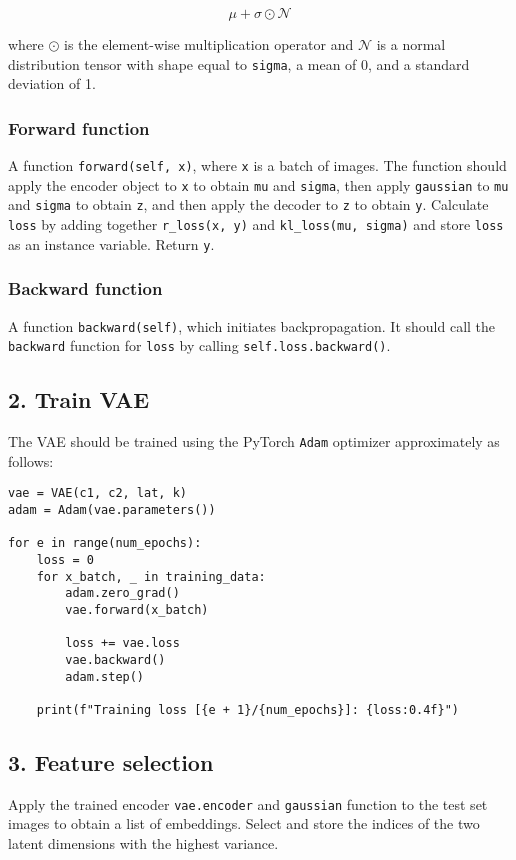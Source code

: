 \documentclass{article}
\begin{document}
\[\mu + \sigma \odot \mathcal{N}\]

where $\odot$ is the element-wise multiplication operator and $\mathcal{N}$ is a normal distribution tensor with shape equal to \texttt{sigma}, a mean of 0, and a standard deviation of 1.

\subsubsection*{Forward function}
A function \texttt{forward(self, x)}, where \texttt{x} is a batch of images. The function should apply the encoder object to \texttt{x} to obtain \texttt{mu} and \texttt{sigma}, then apply \texttt{gaussian} to \texttt{mu} and \texttt{sigma} to obtain \texttt{z}, and then apply the decoder to \texttt{z} to obtain \texttt{y}. Calculate \texttt{loss} by adding together \texttt{r\_loss(x, y)} and \texttt{kl\_loss(mu, sigma)} and store \texttt{loss} as an instance variable. Return \texttt{y}.

\subsubsection*{Backward function}
A function \texttt{backward(self)}, which initiates backpropagation. It should call the \texttt{backward} function for \texttt{loss} by calling \texttt{self.loss.backward()}.

\subsection*{2. Train VAE}
The VAE should be trained using the PyTorch \texttt{Adam} optimizer approximately as follows:

\begin{verbatim}
vae = VAE(c1, c2, lat, k)
adam = Adam(vae.parameters())

for e in range(num_epochs):
    loss = 0
    for x_batch, _ in training_data:
        adam.zero_grad()
        vae.forward(x_batch)

        loss += vae.loss
        vae.backward()
        adam.step()

    print(f"Training loss [{e + 1}/{num_epochs}]: {loss:0.4f}")
\end{verbatim}

\subsection*{3. Feature selection}
Apply the trained encoder \texttt{vae.encoder} and \texttt{gaussian} function to the test set images to obtain a list of embeddings. Select and store the indices of the two latent dimensions with the highest variance.
\end{document}

